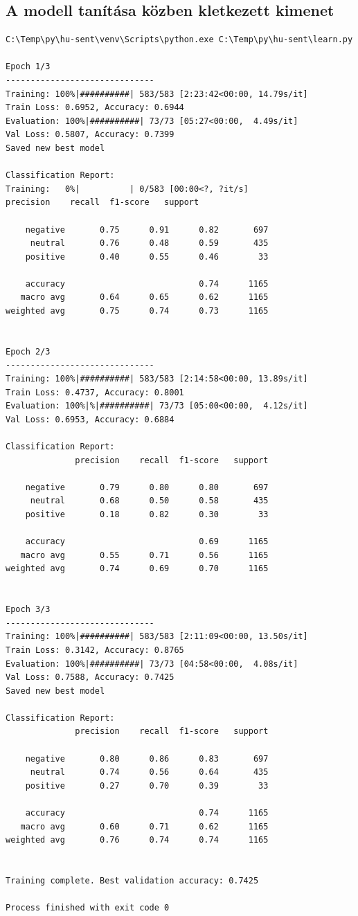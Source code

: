 \documentclass[12pt]{article}
\begin{document}
\subsection{A modell tanítása közben kletkezett kimenet}

\begin{lstlisting}[style=docker]
C:\Temp\py\hu-sent\venv\Scripts\python.exe C:\Temp\py\hu-sent\learn.py

Epoch 1/3
------------------------------
Training: 100%|##########| 583/583 [2:23:42<00:00, 14.79s/it]
Train Loss: 0.6952, Accuracy: 0.6944
Evaluation: 100%|##########| 73/73 [05:27<00:00,  4.49s/it]
Val Loss: 0.5807, Accuracy: 0.7399
Saved new best model

Classification Report:
Training:   0%|          | 0/583 [00:00<?, ?it/s]              precision    recall  f1-score   support

    negative       0.75      0.91      0.82       697
     neutral       0.76      0.48      0.59       435
    positive       0.40      0.55      0.46        33

    accuracy                           0.74      1165
   macro avg       0.64      0.65      0.62      1165
weighted avg       0.75      0.74      0.73      1165


Epoch 2/3
------------------------------
Training: 100%|##########| 583/583 [2:14:58<00:00, 13.89s/it]
Train Loss: 0.4737, Accuracy: 0.8001
Evaluation: 100%|%|##########| 73/73 [05:00<00:00,  4.12s/it]
Val Loss: 0.6953, Accuracy: 0.6884

Classification Report:
              precision    recall  f1-score   support

    negative       0.79      0.80      0.80       697
     neutral       0.68      0.50      0.58       435
    positive       0.18      0.82      0.30        33

    accuracy                           0.69      1165
   macro avg       0.55      0.71      0.56      1165
weighted avg       0.74      0.69      0.70      1165


Epoch 3/3
------------------------------
Training: 100%|##########| 583/583 [2:11:09<00:00, 13.50s/it]
Train Loss: 0.3142, Accuracy: 0.8765
Evaluation: 100%|##########| 73/73 [04:58<00:00,  4.08s/it]
Val Loss: 0.7588, Accuracy: 0.7425
Saved new best model

Classification Report:
              precision    recall  f1-score   support

    negative       0.80      0.86      0.83       697
     neutral       0.74      0.56      0.64       435
    positive       0.27      0.70      0.39        33

    accuracy                           0.74      1165
   macro avg       0.60      0.71      0.62      1165
weighted avg       0.76      0.74      0.74      1165


Training complete. Best validation accuracy: 0.7425

Process finished with exit code 0
\end{lstlisting}
\end{document}
